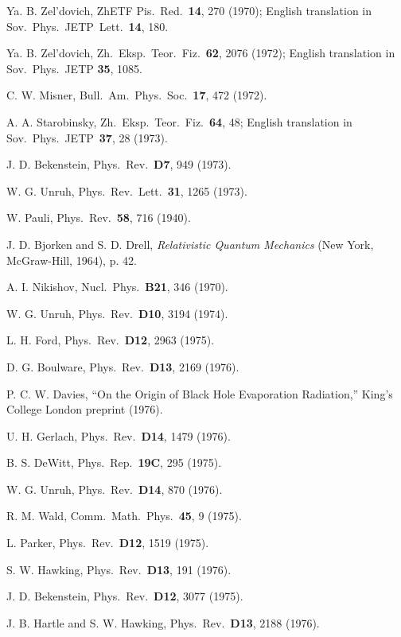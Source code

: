 \documentclass[12pt]{article} \usepackage{latexsym} \textwidth 15cm
\begin{document}
\begin{thebibliography}{99}
 Ya. B. Zel'dovich, ZhETF Pis.\ Red.\ {\bf 14}, 270
  (1970); English translation in Sov.\ Phys.\ JETP\ Lett.\ {\bf 14},
  180.

 Ya. B. Zel'dovich, Zh.\ Eksp.\ Teor.\ Fiz.\ {\bf 62},
  2076 (1972); English translation in Sov.\ Phys.\ JETP {\bf 35},
  1085.

 C. W. Misner, Bull.\ Am.\ Phys.\ Soc.\ {\bf 17}, 472
  (1972).

 A. A. Starobinsky, Zh.\ Eksp.\ Teor.\ Fiz.\ {\bf 64},
  48; English translation in Sov.\ Phys.\ JETP\ {\bf 37}, 28 (1973).

 J. D. Bekenstein, Phys.\ Rev.\ {\bf D7}, 949 (1973).

 W. G. Unruh, Phys.\ Rev.\ Lett.\ {\bf 31}, 1265 (1973).

 W. Pauli, Phys.\ Rev.\ {\bf 58}, 716 (1940).

 J. D. Bjorken and S. D. Drell, \emph{Relativistic Quantum
  Mechanics} (New York, McGraw-Hill, 1964), p. 42.

 A. I. Nikishov, Nucl.\ Phys.\ {\bf B21}, 346 (1970).

 W. G. Unruh, Phys.\ Rev.\ {\bf D10}, 3194 (1974).

 L. H. Ford, Phys.\ Rev.\ {\bf D12}, 2963 (1975).

 D. G. Boulware, Phys.\ Rev.\ {\bf D13}, 2169 (1976).

 P. C. W. Davies, ``On the Origin of Black Hole
  Evaporation Radiation,'' King's College London preprint (1976).

 U. H. Gerlach, Phys.\ Rev.\ {\bf D14}, 1479 (1976).

 B. S. DeWitt, Phys.\ Rep.\ {\bf 19C}, 295 (1975).

 W. G. Unruh, Phys.\ Rev.\ {\bf D14}, 870 (1976).

 R. M. Wald, Comm.\ Math.\ Phys.\ {\bf 45}, 9 (1975).

 L. Parker, Phys.\ Rev.\ {\bf D12}, 1519 (1975).

 S. W. Hawking, Phys.\ Rev.\ {\bf D13}, 191 (1976).

 J. D. Bekenstein, Phys.\ Rev.\ {\bf D12}, 3077 (1975).

 J. B. Hartle and S. W. Hawking, Phys.\ Rev.\ {\bf D13},
  2188 (1976).


\end{thebibliography}
\end{document}
